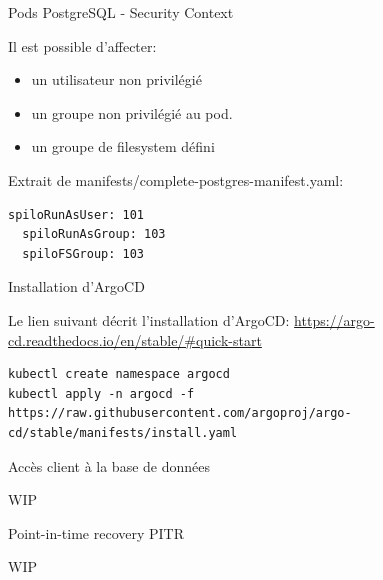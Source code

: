 \begin{frame}[fragile]{Pods PostgreSQL - Security Context}

   Il est possible d'affecter:
\begin{itemize}
   \item un utilisateur non privilégié
   \item un groupe non privilégié au pod.
   \item un groupe de filesystem défini
\end{itemize}

   Extrait de manifests/complete-postgres-manifest.yaml:
\begin{tiny}
\begin{Verbatim}[commandchars=\&\@\@]
  spiloRunAsUser: 101
  spiloRunAsGroup: 103
  spiloFSGroup: 103
\end{Verbatim}
\end{tiny}

\end{frame}


\begin{frame}[fragile]{Installation d'ArgoCD}

Le lien suivant décrit l'installation d'ArgoCD: \url{https://argo-cd.readthedocs.io/en/stable/#quick-start}

\begin{tiny}
\begin{Verbatim}[commandchars=\&\#\#]
kubectl create namespace argocd
kubectl apply -n argocd -f https://raw.githubusercontent.com/argoproj/argo-cd/stable/manifests/install.yaml
\end{Verbatim}
\end{tiny}

\end{frame}


\begin{frame}[fragile]{Accès client à la base de données}

   WIP

\end{frame}


\begin{frame}[fragile]{Point-in-time recovery PITR}

   WIP

\end{frame}

